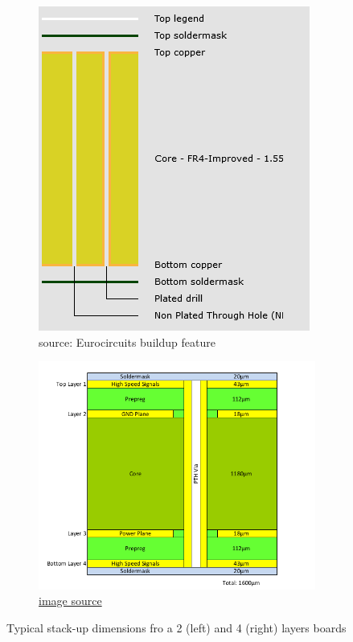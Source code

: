 \documentclass[final]{cubedoc}
\begin{document}
	\begin{figure}[h!]
		\centering
		\begin{subfigure}{.4\textwidth}
			\centering
			\includegraphics[height=0.25\textheight, width=\textwidth]{assets/2_layer_euro.png}
			\caption{source: Eurocircuits buildup feature}
		\end{subfigure}
		\begin{subfigure}{.4\textwidth}
			\centering
			\includegraphics[height=0.25\textheight, width=\textwidth]{assets/4_layer_PCB.png}
			\caption{\href{https://web.archive.org/web/20200813153211/https://docs.toradex.com/102492-layout-design-guide.pdf}{image source}}
		\end{subfigure}
		\caption{Typical stack-up dimensions fro a 2 (left) and 4 (right) layers boards}
	\end{figure}
	
\end{document}
